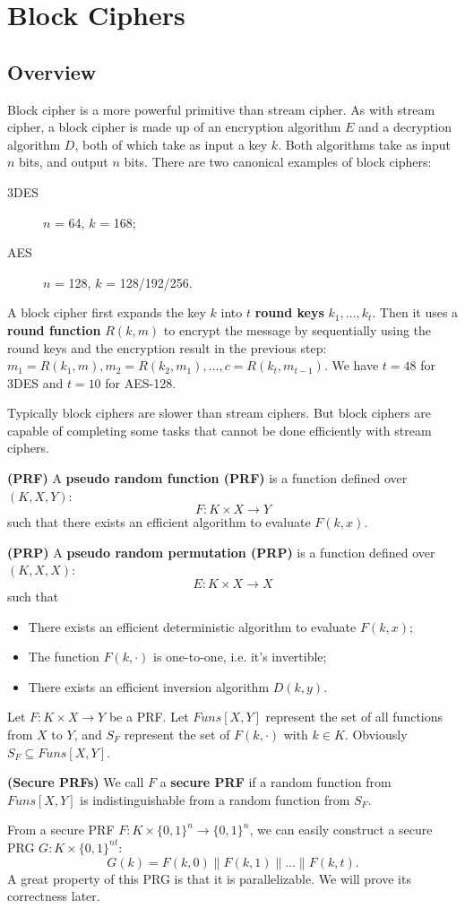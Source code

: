  \ifx\PREAMBLE\undefined


\fi
\chapter{Block Ciphers}
\section{Overview}
Block cipher is a more powerful primitive than stream cipher. As with stream cipher, a block cipher is made up of an encryption algorithm $E$ and a decryption algorithm $D$, both of which take as input a key $k$. Both algorithms take as input $n$ bits, and output $n$ bits. There are two canonical examples of block ciphers:
\begin{description}
\item[3DES]$n$ = 64, $k$ = 168;
\item[AES]$n$ = 128, $k$ = 128/192/256.
\end{description}
A block cipher first expands the key $k$ into $t$ \textbf{round keys} $k_1,\dots,k_t$. Then it uses a \textbf{round function} $R(k,m)$ to encrypt the message by sequentially using the round keys and the encryption result in the previous step: $m_1=R(k_1,m),m_2=R(k_2,m_1),\dots,c=R(k_t,m_{t-1})$. We have $t=48$ for 3DES and $t=10$ for AES-128.

Typically block ciphers are slower than stream ciphers. But block ciphers are capable of completing some tasks that cannot be done efficiently with stream ciphers.

\begin{definition}\textbf{(PRF)}
A \textbf{pseudo random function (PRF)} is a function defined over $(K,X,Y)$:
\[F:K\times X\rightarrow Y\]
such that there exists an efficient algorithm to evaluate $F(k,x)$. 
\end{definition}
\begin{definition}\textbf{(PRP)}
A \textbf{pseudo random permutation (PRP)} is a function defined over $(K,X,X)$:
\[E:K\times X\rightarrow X\]
such that 
\begin{itemize}
\item There exists an efficient deterministic algorithm to evaluate $F(k,x)$;
\item The function $F(k,\cdot)$ is one-to-one, i.e. it's invertible;
\item There exists an efficient inversion algorithm $D(k,y)$.
\end{itemize}
\end{definition}
Let $F:K\times X\rightarrow Y$ be a PRF. Let $Funs[X,Y]$ represent the set of all functions from $X$ to $Y$, and $S_F$ represent the set of $F(k,\cdot)$ with $k\in K$. Obviously $S_F\subseteq Funs[X,Y]$.
\begin{definition}\textbf{(Secure PRFs)}
We call $F$ a \textbf{secure PRF} if a random function from $Funs[X,Y]$ is indistinguishable from a random function from $S_F$.
\end{definition}
From a secure PRF $F:K\times \{0,1\}^n\rightarrow\{0,1\}^n$, we can easily construct a secure PRG $G:K\times\{0,1\}^{nt}$:
\[G(k)=F(k,0)\parallel F(k,1)\parallel\dots\parallel F(k,t).\]
A great property of this PRG is that it is parallelizable. We will prove its correctness later.
